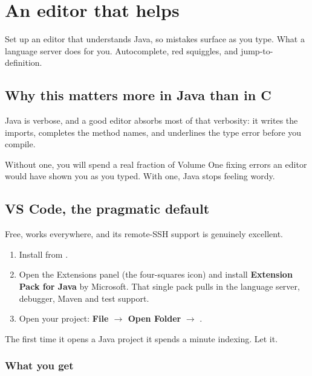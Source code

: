 \chapter{An editor that helps}
\label{ch:editor}

\chapterbrief
  {Set up an editor that understands Java, so mistakes surface as you type.}
  {What a language server does for you.}
  {Autocomplete, red squiggles, and jump-to-definition.}

\section{Why this matters more in Java than in C}

Java is verbose, and a good editor absorbs most of that verbosity: it writes the
imports, completes the method names, and underlines the type error before you
compile.

Without one, you will spend a real fraction of Volume One fixing errors an editor
would have shown you as you typed. With one, Java stops feeling wordy.

\section{VS Code, the pragmatic default}

Free, works everywhere, and its remote-SSH support is genuinely excellent.

\begin{enumerate}
  \item Install from .
  \item Open the Extensions panel (the four-squares icon) and install
        \textbf{Extension Pack for Java} by Microsoft. That single pack pulls in
        the language server, debugger, Maven and test support.
  \item Open your project: \textbf{File $\rightarrow$ Open Folder}
        $\rightarrow$ .
\end{enumerate}

The first time it opens a Java project it spends a minute indexing. Let it.

\subsection*{What you get}

